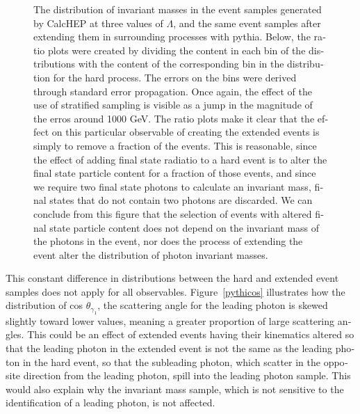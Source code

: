\begin{english}
\begin{figure}[hbt]
\centering
\begin{minipage}[b]{.69\textwidth}\hspace{-1.5em}\makebox[0pt][l]{
\noindent\begin{infilsf}
\tiny

\end{infilsf}}
\end{minipage}\hfill
\caption{The distribution of invariant masses in the event samples generated by CalcHEP at three values of $\Lambda$, and the same event samples after extending them in surrounding processes with pythia. Below, the ratio plots were created by dividing the content in each bin of the distributions with the content of the corresponding bin in the distribution for the hard process. The errors on the bins were derived through standard error propagation. Once again, the effect of the use of stratified sampling is visible as a jump in the magnitude of the erros around 1000 GeV. The ratio plots make it clear that the effect on this particular observable of creating the extended events is simply to remove a fraction of the events. This is reasonable, since the effect of adding final state radiatio to a hard event is to alter the final state particle content for a fraction of those events, and since we require two final state photons to calculate an invariant mass, final states that do not contain two photons are discarded. We can conclude from this figure that the selection of events with altered final state particle content does not depend on the invariant mass of the photons in the event, nor does the process of extending the event alter the distribution of photon invariant masses.
\label{pythify}}
\end{figure}

This constant difference in distributions between the hard and extended event samples does not apply for all observables. Figure~\ref{pythicos} illustrates how the distribution of cos $\theta_{\gamma_1}$, the scattering angle for the leading photon is skewed slightly toward lower values, meaning a greater proportion of large scattering angles. This could be an effect of extended events having their kinematics altered so that the leading photon in the extended event is not the same as the leading photon in the hard event, so that the subleading photon, which scatter in the opposite direction from the leading photon, spill into the leading photon sample. This would also explain why the invariant mass sample, which is not sensitive to the identification of a leading photon, is not affected.


\end{english}
